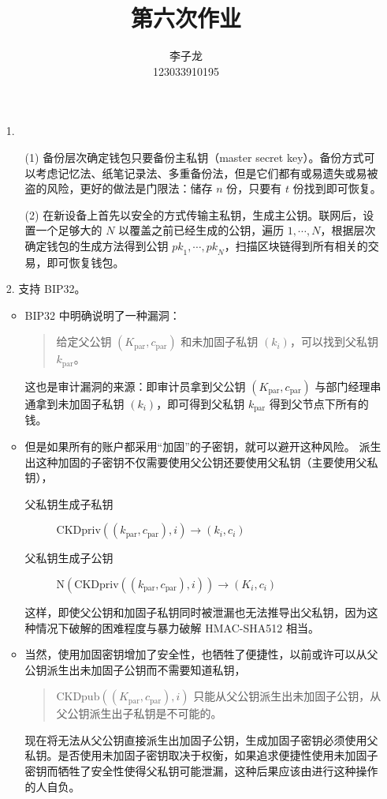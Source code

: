\documentclass{sjtuarticle}
\title{第六次作业}
\author{李子龙\\123033910195}
\begin{document}
\maketitle
\begin{itemize}
    \item[1.] \begin{itemize}
        \item[(1)] 备份层次确定钱包只要备份主私钥（master secret key）。备份方式可以考虑记忆法、纸笔记录法、多重备份法，但是它们都有或易遗失或易被盗的风险，更好的做法是门限法：储存 $n$ 份，只要有 $t$ 份找到即可恢复。
        \item[(2)] 在新设备上首先以安全的方式传输主私钥，生成主公钥。联网后，设置一个足够大的 $N$ 以覆盖之前已经生成的公钥，遍历 $1,\cdots,N$，根据层次确定钱包的生成方法得到公钥 $\mathit{pk}_1,\cdots,\mathit{pk}_N$，扫描区块链得到所有相关的交易，即可恢复钱包。
    \end{itemize}
    \item[2.] 支持 BIP32。
    
    \begin{itemize}
        \item BIP32 中明确说明了一种漏洞：
        \begin{quotation}
            给定父公钥 $(K_\text{par},c_\text{par})$ 和未加固子私钥 $(k_i)$，可以找到父私钥 $k_\text{par}$。
        \end{quotation}
        这也是审计漏洞的来源：即审计员拿到父公钥 $(K_\text{par},c_\text{par})$ 与部门经理串通拿到未加固子私钥 $(k_i)$，即可得到父私钥 $k_\text{par}$ 得到父节点下所有的钱。
        \item 但是如果所有的账户都采用“加固”的子密钥，就可以避开这种风险。
        派生出这种加固的子密钥不仅需要使用父公钥还要使用父私钥（主要使用父私钥），
        \begin{description}
            \item[父私钥生成子私钥] $\text{CKDpriv}((k_\text{par},c_\text{par}), i)\rightarrow (k_i,c_i)$
            \item[父私钥生成子公钥] $\text{N}(\text{CKDpriv}((k_\text{par},c_\text{par}), i))\rightarrow (K_i,c_i)$
        \end{description}
        这样，即使父公钥和加固子私钥同时被泄漏也无法推导出父私钥，因为这种情况下破解的困难程度与暴力破解 HMAC-SHA512 相当。
        \item 当然，使用加固密钥增加了安全性，也牺牲了便捷性，以前或许可以从父公钥派生出未加固子公钥而不需要知道私钥，
        \begin{quotation}
            $\text{CKDpub}((K_\text{par},c_\text{par}),i)$ 只能从父公钥派生出未加固子公钥，从父公钥派生出子私钥是不可能的。
        \end{quotation}
        现在将无法从父公钥直接派生出加固子公钥，生成加固子密钥必须使用父私钥。是否使用未加固子密钥取决于权衡，如果追求便捷性使用未加固子密钥而牺牲了安全性使得父私钥可能泄漏，这种后果应该由进行这种操作的人自负。    
    \end{itemize}
\end{itemize}
\end{document}
